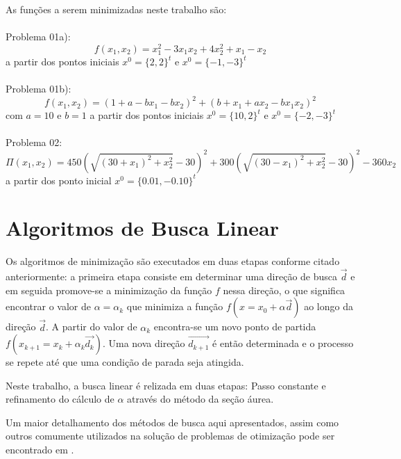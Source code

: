 \documentclass[10pt, a4paper]{article}
\begin{document}
As fun\c c\~oes a serem minimizadas neste trabalho s\~ao: \\
\\
Problema 01a):
\begin{equation}\label{fun:01a}\tag{1a}
      f(x_{1},x_{2})=x_{1}^2 - 3x_{1}x_{2} + 4x_{2}^2 + x_{1} - x_{2}
\end{equation}
a partir dos pontos iniciais $x^0=\{2,2\}^t$ e $x^0=\{-1,-3\}^t$
\\ \\
Problema 01b):
\begin{equation}\label{fun:01b}\tag{1b}
f(x_{1},x_{2}) = (1+a-bx_{1}-bx_{2})^2 + (b+x_{1}+ax_{2} - bx_{1}x_{2})^2
\end{equation}
com $a=10$ e $b=1$ a partir dos pontos iniciais $x^0=\{10,2\}^t$ e $x^0=\{-2,-3\}^t$
\\ \\
Problema 02:
\begin{equation}\label{fun:02}\tag{2}
\Pi(x_{1},x_{2})= 450(\sqrt{(30+x_{1})^2+x_{2}^2}-30)^2 + 300(\sqrt{(30-x_{1})^2+x_{2}^2}-30)^2 -360x_{2}
\end{equation}
a partir dos ponto inicial $x^0=\{0.01,-0.10\}^t$


\section{Algoritmos de Busca Linear}

Os algoritmos de minimiza\c c\~ao s\~ao executados em duas etapas conforme citado anteriormente: a primeira etapa consiste em determinar uma dire\c c\~ao de busca $\vec{d}$ e em seguida promove-se a minimiza\c c\~ao da fun\c c\~ao $f$ nessa dire\c c\~ao, o que significa encontrar o valor de  $\alpha=\alpha_{k}$ que minimiza a fun\c c\~ao $f(x=x_{0}+\alpha\vec{d})$ ao longo da dire\c c\~ao $\vec{d}$. A partir do valor de $\alpha_{k}$ encontra-se um novo ponto de partida $f(x_{k+1}=x_{k}+\alpha_{k}\vec{d_{k}})$. Uma nova dire\c c\~ao $\vec{d_{k+1}}$ \'e ent\~ao determinada e o processo se repete at\'e que uma condi\c c\~ao de parada seja atingida.

Neste trabalho, a busca linear \'e relizada em duas etapas: Passo constante e refinamento do c\'alculo de $\alpha$ atrav\'es do m\'etodo da se\c c\~ao \'aurea.

Um maior detalhamento dos m\'etodos de busca aqui apresentados, assim como outros comumente utilizados na solu\c c\~ao de problemas de otimiza\c c\~ao pode ser encontrado em \cite{apostila}.
\end{document}
